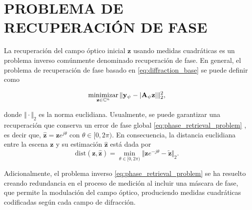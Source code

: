 

\section{PROBLEMA DE RECUPERACIÓN DE FASE}

La recuperación del campo óptico inicial $\mathbf{z}$ usando medidas cuadráticas es un problema inverso comúnmente denominado recuperación de fase. En general, el problema de recuperación de fase basado en \eqref{eq:diffraction_base} se puede definir como 

\begin{equation}
    \operatorname*{minimizar}_{\mathbf{z}\in\mathbb{C}^n}\Vert\mathbf{y}_{\psi} - \vert \mathbf{A}_{\psi}\mathbf{z} \vert\Vert_2^2, 
    \label{eq:phase_retrieval_problem}
\end{equation}

donde $\Vert \cdot\Vert_2$ es la norma euclidiana. Usualmente, se puede garantizar una recuperación que conserva un error de fase global \eqref{eq:phase_retrieval_problem} , es decir que, $\hat{\mathbf{z}} = \hat{\mathbf{z}}e^{j\theta}$ con $\theta \in [0, 2\pi)$. En consecuencia, la distancia euclidiana entre la escena $\mathbf{z}$ y su estimación $\hat{\mathbf{z}}$ está dada por
\begin{equation}
    \mathrm{dist}(\mathbf{z}, \hat{\mathbf{z}}) = \min_{\theta \in [0, 2\pi)}\Vert \mathbf{z}e^{-j\theta} - \tilde{\mathbf{z}}\Vert_2.
\end{equation}

Adicionalmente, el problema inverso \eqref{eq:phase_retrieval_problem} se ha resuelto creando redundancia en el proceso de medición al incluir una máscara de fase, que permite la modulación del campo óptico, produciendo medidas cuadráticas codificadas según cada campo de difracción.



